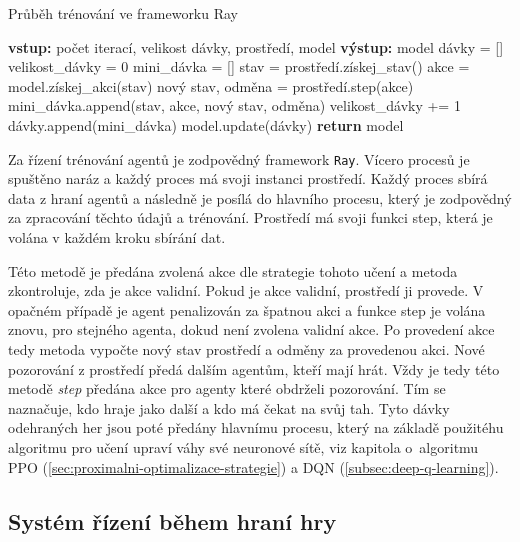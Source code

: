 \begin{algorithm}[H]
  \caption{Průběh trénování ve frameworku Ray}
  \label{alg:training}
  \begin{algorithmic}
    \State \textbf{vstup:} počet iterací, velikost dávky, prostředí, model
    \State \textbf{výstup:} model
    \State
    \State dávky = []
        \State velikost\_dávky = 0
        \State mini\_dávka = []
          \State stav = prostředí.získej\_stav()
          \State akce = model.získej\_akci(stav)
          \State nový stav, odměna = prostředí.step(akce)
          \State mini\_dávka.append(stav, akce, nový stav, odměna)
          \State velikost\_dávky += 1
        \EndWhile
        \State dávky.append(mini\_dávka)
      \EndFor 
      \State model.update(dávky)
    \EndFor
    \State \textbf{return} model
  \end{algorithmic}
\end{algorithm}


Za řízení trénování agentů je zodpovědný framework \texttt{Ray}.
Vícero procesů je spuštěno naráz a každý proces má svoji instanci prostředí.
Každý proces sbírá data z hraní agentů a následně je posílá do hlavního procesu, který je zodpovědný za zpracování těchto údajů a trénování.
Prostředí má svoji funkci step, která je volána v každém kroku sbírání dat.

Této metodě je předána zvolená akce dle strategie tohoto učení a metoda zkontroluje, zda je akce validní.
Pokud je akce validní, prostředí ji provede.
V opačném případě je agent penalizován za špatnou akci a funkce step je volána znovu, pro stejného agenta, dokud není zvolena validní akce.
Po provedení akce tedy metoda vypočte nový stav prostředí a odměny za provedenou akci.
Nové pozorování z prostředí předá dalším agentům, kteří mají hrát.
Vždy je tedy této metodě \emph{step} předána akce pro agenty které obdrželi pozorování.
Tím se naznačuje, kdo hraje jako další a kdo má čekat na svůj tah.
Tyto dávky odehraných her jsou poté předány hlavnímu procesu, který na základě použitéhu algoritmu pro učení upraví váhy své neuronové sítě, viz kapitola o~algoritmu PPO (\ref{sec:proximalni-optimalizace-strategie}) a DQN (\ref{subsec:deep-q-learning}).

\subsection{Systém řízení během hraní hry}

